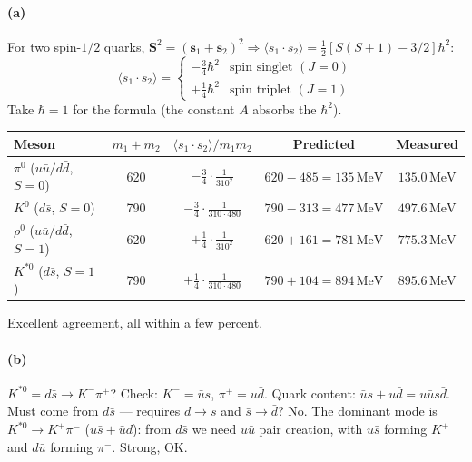 \documentclass[11pt]{article}
\newcommand{\MeV}{\,\mathrm{MeV}}
\begin{document}
\paragraph{(a)} For two spin-$1/2$ quarks, $\mathbf{S}^{2}=(\mathbf{s}_1+\mathbf{s}_2)^{2}\Rightarrow \langle s_1\cdot s_2\rangle=\tfrac{1}{2}[S(S+1)-3/2]\hbar^{2}$:
\[
\langle s_1\cdot s_2\rangle = \begin{cases}-\tfrac{3}{4}\hbar^{2} & \text{spin singlet }(J=0)\\+\tfrac{1}{4}\hbar^{2} & \text{spin triplet }(J=1)\end{cases}
\]
Take $\hbar=1$ for the formula (the constant $A$ absorbs the $\hbar^{2}$).

\begin{center}
\begin{tabular}{@{}lcccc@{}}\hline
Meson & $m_1+m_2$ & $\langle s_1\cdot s_2\rangle/m_1m_2$ & Predicted & Measured \\\hline
$\pi^0$ ($u\bar u/d\bar d$, $S=0$) & 620 & $-\tfrac34\cdot \tfrac{1}{310^{2}}$ & $620-485=135\MeV$ & $135.0\MeV$ \\
$K^0$ ($d\bar s$, $S=0$) & 790 & $-\tfrac34\cdot \tfrac{1}{310\cdot 480}$ & $790-313=477\MeV$ & $497.6\MeV$ \\
$\rho^0$ ($u\bar u/d\bar d$, $S=1$) & 620 & $+\tfrac14\cdot\tfrac{1}{310^{2}}$ & $620+161=781\MeV$ & $775.3\MeV$\\
$K^{*0}$ ($d\bar s$, $S=1$) & 790 & $+\tfrac14\cdot\tfrac{1}{310\cdot 480}$ & $790+104=894\MeV$ & $895.6\MeV$\\\hline
\end{tabular}
\end{center}
Excellent agreement, all within a few percent.

\paragraph{(b)} $K^{*0}=d\bar s\to K^- \pi^+$? Check: $K^-=\bar u s$, $\pi^+=u\bar d$. Quark content: $\bar u s + u\bar d = u\bar u s\bar d$. Must come from $d\bar s$ --- requires $d\to s$ and $\bar s\to\bar d$? No. The dominant mode is $K^{*0}\to K^+\pi^-$ ($u\bar s + \bar u d$): from $d\bar s$ we need $u\bar u$ pair creation, with $u\bar s$ forming $K^+$ and $d\bar u$ forming $\pi^-$. Strong, OK.

\begin{center}
\end{center}
\end{document}
